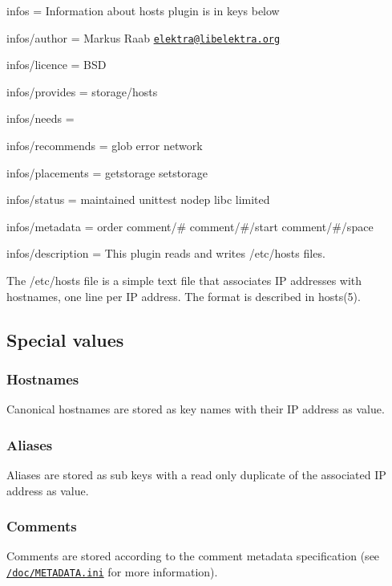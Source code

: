 
\begin{DoxyItemize}
\item infos = Information about hosts plugin is in keys below
\item infos/author = Markus Raab \href{mailto:elektra@libelektra.org}{\tt elektra@libelektra.\+org}
\item infos/licence = B\+SD
\item infos/provides = storage/hosts
\item infos/needs =
\item infos/recommends = glob error network
\item infos/placements = getstorage setstorage
\item infos/status = maintained unittest nodep libc limited
\item infos/metadata = order comment/\# comment/\#/start comment/\#/space
\item infos/description = This plugin reads and writes /etc/hosts files.
\end{DoxyItemize}

The {\ttfamily /etc/hosts} file is a simple text file that associates IP addresses with hostnames, one line per IP address. The format is described in {\ttfamily hosts(5)}.

\subsection*{Special values}

\subsubsection*{Hostnames}

Canonical hostnames are stored as key names with their IP address as value.

\subsubsection*{Aliases}

Aliases are stored as sub keys with a read only duplicate of the associated IP address as value.

\subsubsection*{Comments}

Comments are stored according to the comment metadata specification (see \href{/home/markus/Projekte/Elektra/current/doc/METADATA.ini}{\tt /doc/\+M\+E\+T\+A\+D\+A\+TA.ini} for more information).


